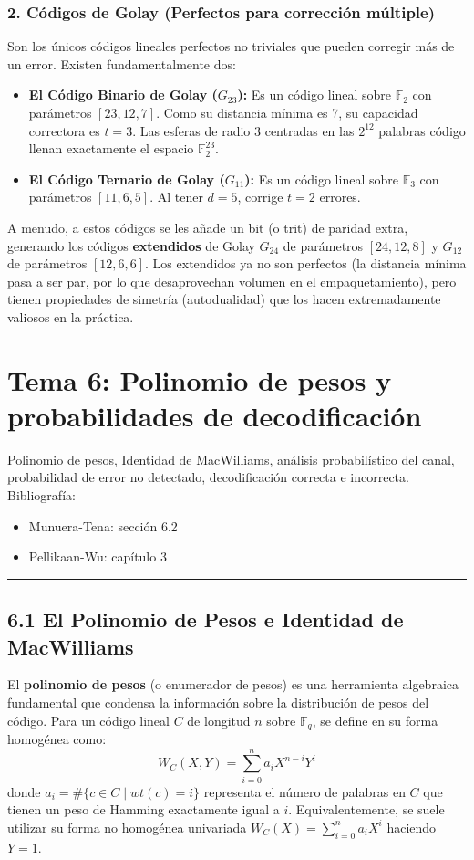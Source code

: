 \documentclass{article}
\newcommand{\hlinecolor}{\noindent\textcolor{azuloscuro}{\rule{\textwidth}{1pt}}}
\begin{document}
\subsubsection{2. Códigos de Golay (Perfectos para corrección múltiple)}
Son los únicos códigos lineales perfectos no triviales que pueden corregir más de un error. Existen fundamentalmente dos:
\begin{itemize}
    \item \textbf{El Código Binario de Golay ($G_{23}$):} Es un código lineal sobre $\mathbb{F}_2$ con parámetros $[23, 12, 7]$. Como su distancia mínima es 7, su capacidad correctora es $t=3$. Las esferas de radio 3 centradas en las $2^{12}$ palabras código llenan exactamente el espacio $\mathbb{F}_2^{23}$.
    \item \textbf{El Código Ternario de Golay ($G_{11}$):} Es un código lineal sobre $\mathbb{F}_3$ con parámetros $[11, 6, 5]$. Al tener $d=5$, corrige $t=2$ errores.
\end{itemize}
A menudo, a estos códigos se les añade un bit (o trit) de paridad extra, generando los códigos \textbf{extendidos} de Golay $G_{24}$ de parámetros $[24, 12, 8]$ y $G_{12}$ de parámetros $[12, 6, 6]$. Los extendidos ya no son perfectos (la distancia mínima pasa a ser par, por lo que desaprovechan volumen en el empaquetamiento), pero tienen propiedades de simetría (autodualidad) que los hacen extremadamente valiosos en la práctica.

\newpage
\section{Tema 6: Polinomio de pesos y probabilidades de decodificación}
Polinomio de pesos, Identidad de MacWilliams, análisis probabilístico del canal, probabilidad de error no detectado, decodificación correcta e incorrecta.\\
Bibliografía:
\begin{itemize}
\item Munuera-Tena: sección 6.2
\item Pellikaan-Wu: capítulo 3
\end{itemize}
\hlinecolor{}
\vspace{0.5cm}

\subsection{6.1 El Polinomio de Pesos e Identidad de MacWilliams}

El \textbf{polinomio de pesos} (o enumerador de pesos) es una herramienta algebraica fundamental que condensa la información sobre la distribución de pesos del código. Para un código lineal $C$ de longitud $n$ sobre $\mathbb{F}_q$, se define en su forma homogénea como:
\[
W_C(X, Y) = \sum_{i=0}^{n} a_{i}X^{n-i}Y^{i}
\]
donde $a_i = \#\{c \in C \mid wt(c) = i\}$ representa el número de palabras en $C$ que tienen un peso de Hamming exactamente igual a $i$. Equivalentemente, se suele utilizar su forma no homogénea univariada $W_C(X) = \sum_{i=0}^{n} a_{i}X^{i}$ haciendo $Y=1$.
\end{document}
